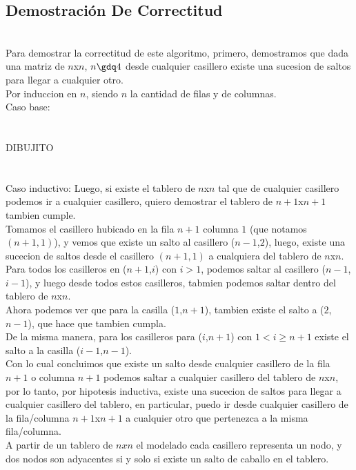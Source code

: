 \subsection{Demostraci\'on De Correctitud}
\\
Para demostrar la correctitud de este algoritmo, primero, demostramos que dada una matriz de $n$x$n$, $n\gdq 4$ desde cualquier casillero existe una sucesion de saltos para llegar a cualquier otro. 
\\
Por induccion en $n$, siendo $n$ la cantidad de filas y de columnas.
\\
Caso base:
\\
\\
\\
DIBUJITO
\\
\\
\\
Caso inductivo:
Luego, si existe el tablero de $n$x$n$ tal que de cualquier casillero podemos ir a cualquier casillero, quiero demostrar el tablero de $n+1$x$n+1$ tambien cumple.
\\
Tomamos el casillero hubicado en la fila $n+1$ columna $1$ (que notamos $(n+1,1)$), y vemos que existe un salto al casillero ($n-1$,$2$), luego, existe una sucecion de saltos desde el casillero $(n+1,1)$ a cualquiera del tablero de $n$x$n$.
\\
Para todos los casilleros en ($n+1$,$i$) con $i>1$, podemos saltar al casillero ($n-1$,$i-1$), y luego desde todos estos casilleros, tabmien podemos saltar dentro del tablero de $n$x$n$.
\\
Ahora podemos ver que para la casilla ($1$,$n+1$), tambien existe el salto a ($2$,$n-1$), que hace que tambien cumpla.
\\
De la misma manera, para los casilleros para ($i$,$n+1$) con $1< i \geq n+1$ existe el salto a la casilla ($i-1$,$n-1$).
\\
Con lo cual concluimos que existe un salto desde cualquier casillero de la fila $n+1$ o columna $n+1$ podemos saltar a cualquier casillero del tablero de $n$x$n$, por lo tanto, por hipotesis inductiva, existe una sucecion de saltos para llegar a cualquier casillero del tablero, en particular, puedo ir desde cualquier casillero de la fila/columna $n+1$x$n+1$ a cualquier otro que pertenezca a la misma fila/columna.
\\
A partir de un tablero de $nxn$ el modelado cada casillero representa un nodo, y dos nodos son adyacentes si y solo si existe un salto de caballo en el tablero.
\\
